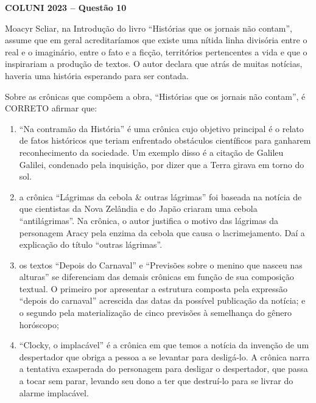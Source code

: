 \textbf{COLUNI 2023 -- Questão 10}\par\medskip Moacyr Scliar, na Introdução do livro “Histórias que os jornais não contam”, assume que em geral acreditaríamos que existe uma nítida linha divisória entre o real e o imaginário, entre o fato e a ficção, territórios pertencentes a vida e que o inspirariam a produção de textos. O autor declara que atrás de muitas notícias, haveria uma história esperando para ser contada.

\par

Sobre as crônicas que compõem a obra, “Histórias que os jornais não contam”, é CORRETO afirmar que:\begin{enumerate}
\item “Na contramão da História” é uma crônica cujo objetivo principal é o relato de fatos históricos que teriam
       enfrentado obstáculos científicos para ganharem reconhecimento da sociedade. Um exemplo disso é a citação
       de Galileu Galilei, condenado pela inquisição, por dizer que a Terra girava em torno do sol.
\item a crônica “Lágrimas da cebola \& outras lágrimas” foi baseada na notícia de que cientistas da Nova Zelândia e
       do Japão criaram uma cebola “antilágrimas”. Na crônica, o autor justifica o motivo das lágrimas da personagem
       Aracy pela enzima da cebola que causa o lacrimejamento. Daí a explicação do título “outras lágrimas”.
\item os textos “Depois do Carnaval” e “Previsões sobre o menino que nasceu nas alturas” se diferenciam das
       demais crônicas em função de sua composição textual. O primeiro por apresentar a estrutura composta pela
       expressão “depois do carnaval” acrescida das datas da possível publicação da notícia; e o segundo pela
       materialização de cinco previsões à semelhança do gênero horóscopo;
\item “Clocky, o implacável” é a crônica em que temos a notícia da invenção de um despertador que obriga a pessoa a
       se levantar para desligá-lo. A crônica narra a tentativa exasperada do personagem para desligar o despertador,
       que passa a tocar sem parar, levando seu dono a ter que destruí-lo para se livrar do alarme implacável.
\end{enumerate}
